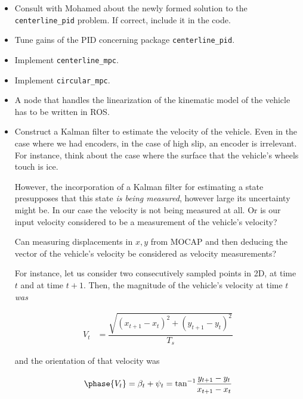 \documentclass[oneside,12pt]{article}
\begin{document}
\begin{itemize}
  \item Consult with Mohamed about the newly formed solution to the
    \texttt{centerline\_pid} problem. If correct, include it in the code.
  \item Tune gains of the PID concerning package \texttt{centerline\_pid}.
  \item Implement \texttt{centerline\_mpc}.
  \item Implement \texttt{circular\_mpc}.
  \item A node that handles the linearization of the kinematic model of the
    vehicle has to be written in ROS.
  \item Construct a Kalman filter to estimate the velocity of the vehicle.
    Even in the case where we had encoders, in the case of high slip, an
    encoder is irrelevant. For instance, think about the case where the
    surface that the vehicle's wheels touch is ice.

    However, the incorporation of a Kalman filter for estimating a state
    presupposes that this state \textit{is being measured}, however large its
    uncertainty might be. In our case the velocity is not being measured at all.
    Or is our input velocity considered to be a measurement of the vehicle's
    velocity?

    Can measuring displacements in $x,y$ from MOCAP and then deducing
    the vector of the vehicle's velocity be considered as velocity measurements?

    For instance, let us consider two consecutively sampled points in 2D, at
    time $t$ and at time $t+1$. Then, the magnitude of the vehicle's velocity at
    time $t$ \textit{was}

    \begin{align}
      V_{t} &= \dfrac{\sqrt{(x_{t+1} - x_t)^2 + (y_{t+1} - y_t)^2}}{T_s}
    \end{align}

    and the orientation of that velocity was

    \begin{align}
      \phase{V_t} = \beta_t + \psi_t = \text{tan}^{-1} \dfrac{y_{t+1} - y_t}{x_{t+1} - x_t}
    \end{align}

    \begin{figure}[H]\centering
      \scalebox{1}{}
      \caption{}
      \label{}
    \end{figure}


\end{itemize}
\end{document}
